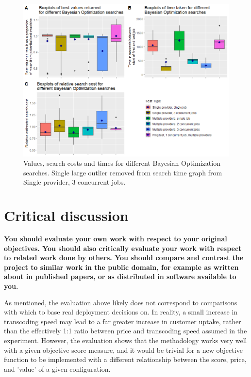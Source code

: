 \documentclass{article}
\begin{document}
\begin{figure}
  \caption{Values, search costs and times for different Bayesian Optimization searches. Single large outlier removed from search time graph from Single provider, 3 concurrent jobs.}
  \label{fig:bo-boxplots}
  \centering
  \includegraphics[scale=0.5]{bo_boxplots}
\end{figure}

\section{Critical discussion}
\textbf{You should evaluate your own work with respect to your
original objectives. You should also critically evaluate
your work with respect to related work done by others.
You should compare and contrast the project to similar
work in the public domain, for example as written about
in published papers, or as distributed in software available to you. }

As mentioned, the evaluation above likely does not correspond to comparisons with which to base real deployment decisions on. In reality, a small increase in transcoding speed may lead to a far greater increase in customer uptake, rather than the effectively 1:1 ratio between price and transcoding speed assumed in the experiment. However, the evaluation shows that the methodology works very well with a given objective score measure, and it would be trivial for a new objective function to be implemented with a different relationship between the score, price, and 'value' of a given configuration.
\end{document}
